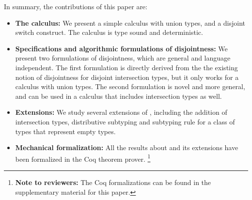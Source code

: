 In summary, the contributions of this paper are:

\begin{itemize}
\item {\bf The \name calculus:} We present a simple calculus with union
  types, and a disjoint switch construct. The calculus is type sound and
  deterministic. 
\item {\bf Specifications and algorithmic formulations of disjointness:}
  We present two formulations of disjointness, which are general and
  language independent. The first formulation is directly derived from
  the the existing notion of disjointness for disjoint intersection types,
  but it only works for a calculus with union types. The second formulation
  is novel and more general, and can be used in a calculus that includes
  intersection types as well.
\item {\bf Extensions:} We study several extensions of \name, including the
  addition of intersection types, distributive subtyping and
  subtyping rule for a class of types that represent empty types.
\item {\bf Mechanical formalization:}
  All the results about \cal and its
  extensions have been formalized in the Coq theorem prover.
  \footnote{{\bf Note to reviewers:} The Coq formalizations can be found in the
  supplementary material for this paper.}
\end{itemize}







